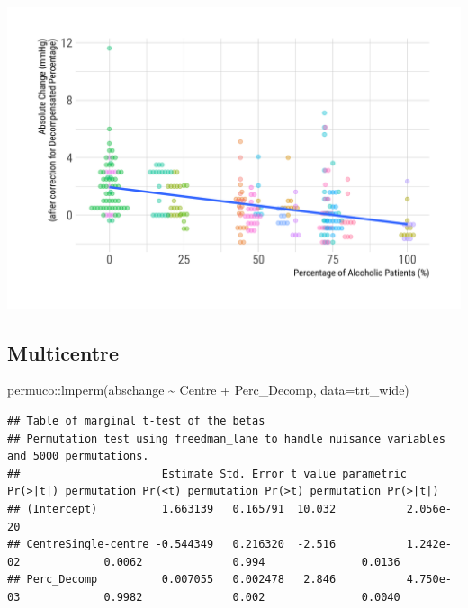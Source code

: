 \documentclass[
]{article}
\newenvironment{Shaded}{\begin{snugshade}}{\end{snugshade}}
\newcommand{\AttributeTok}[1]{\textcolor[rgb]{0.77,0.63,0.00}{#1}}
\newcommand{\FunctionTok}[1]{\textcolor[rgb]{0.00,0.00,0.00}{#1}}
\newcommand{\NormalTok}[1]{#1}
\newcommand{\SpecialCharTok}[1]{\textcolor[rgb]{0.00,0.00,0.00}{#1}}
\begin{document}
\includegraphics{figures/unnamed-chunk-38-1.png}

\hypertarget{multicentre}{%
\subsection{Multicentre}\label{multicentre}}

\begin{Shaded}
\begin{Highlighting}[]
\NormalTok{permuco}\SpecialCharTok{::}\FunctionTok{lmperm}\NormalTok{(abschange }\SpecialCharTok{\textasciitilde{}}\NormalTok{ Centre }\SpecialCharTok{+}\NormalTok{ Perc\_Decomp, }\AttributeTok{data=}\NormalTok{trt\_wide)}
\end{Highlighting}
\end{Shaded}

\begin{verbatim}
## Table of marginal t-test of the betas
## Permutation test using freedman_lane to handle nuisance variables and 5000 permutations.
##                      Estimate Std. Error t value parametric Pr(>|t|) permutation Pr(<t) permutation Pr(>t) permutation Pr(>|t|)
## (Intercept)          1.663139   0.165791  10.032           2.056e-20                                                           
## CentreSingle-centre -0.544349   0.216320  -2.516           1.242e-02             0.0062              0.994               0.0136
## Perc_Decomp          0.007055   0.002478   2.846           4.750e-03             0.9982              0.002               0.0040
\end{verbatim}
\end{document}
